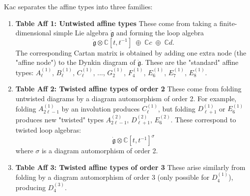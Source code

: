 \documentclass[12pt]{article}
\begin{document}
\begin{remark}
    Kac separates the affine types into three families:
    \begin{enumerate}
        \item \textbf{Table Aff 1: Untwisted affine types}
              These come from taking a finite-dimensional simple Lie algebra $\dot{\mathfrak{g}}$ and forming the loop algebra
              $$\dot{\mathfrak{g}}\otimes \mathbb{C}[t,t^{-1}] \;\oplus\; \mathbb{C}c \;\oplus\; \mathbb{C}d.$$
              The corresponding Cartan matrix is obtained by adding one extra node (the "affine node") to the Dynkin diagram of $\dot{\mathfrak{g}}$.
              These are the "standard" affine types: $A_\ell^{(1)}$, $B_\ell^{(1)}$, $C_\ell^{(1)}$, ..., $G_2^{(1)}$, $F_4^{(1)}$, $E_6^{(1)}$, $E_7^{(1)}$, $E_8^{(1)}$.

        \item \textbf{Table Aff 2: Twisted affine types of order 2}
              These come from folding untwisted diagrams by a diagram automorphism of order 2.
              For example, folding $A_{2\ell-1}^{(1)}$ by an involution produces $C_\ell^{(1)}$, but folding $D_{\ell+1}^{(1)}$ or $E_6^{(1)}$ produces new "twisted" types $A_{2\ell-1}^{(2)}$, $D_{\ell+1}^{(2)}$, $E_6^{(2)}$.
              These correspond to twisted loop algebras:
              $$\dot{\mathfrak{g}}\otimes \mathbb{C}[t,t^{-1}]^\sigma$$
              where $\sigma$ is a diagram automorphism of order 2.

        \item \textbf{Table Aff 3: Twisted affine types of order 3}
              These arise similarly from folding by a diagram automorphism of order 3 (only possible for $D_4^{(1)}$), producing $D_4^{(3)}$.
    \end{enumerate}
\end{remark}
\end{document}
